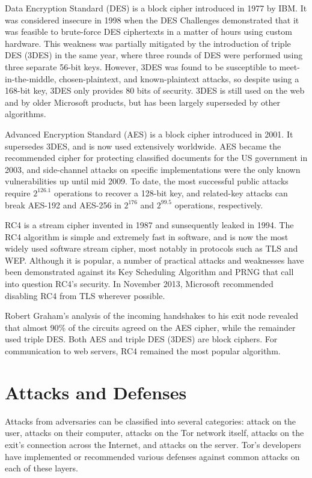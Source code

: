\documentclass[journal]{IEEEtran}
\begin{document}
Data Encryption Standard (DES) is a block cipher introduced in 1977 by IBM. It was considered insecure in 1998 when the DES Challenges demonstrated that it was feasible to brute-force DES ciphertexts in a matter of hours using custom hardware. This weakness was partially mitigated by the introduction of triple DES (3DES) in the same year, where three rounds of DES were performed using three separate 56-bit keys. However, 3DES was found to be susceptible to meet-in-the-middle, chosen-plaintext, and known-plaintext attacks, so despite using a 168-bit key, 3DES only provides 80 bits of security.\cite{NIST2007} 3DES is still used on the web and by older Microsoft products, but has been largely superseded by other algorithms.

Advanced Encryption Standard (AES) is a block cipher introduced in 2001. It supersedes 3DES, and is now used extensively worldwide. AES became the recommended cipher for protecting classified documents for the US government in 2003, and side-channel attacks on specific implementations were the only known vulnerabilities up until mid 2009. To date, the most successful public attacks require $ 2^126.1 $ operations to recover a 128-bit key,\cite{Nikolic2009} and related-key attacks can break AES-192 and AES-256 in $ 2^176 $ and $ 2^99.5 $ operations,\cite{Bogdanov2011} respectively.

RC4 is a stream cipher invented in 1987 and sunsequently leaked in 1994. The RC4 algorithm is simple and extremely fast in software, and is now the most widely used software stream cipher, most notably in protocols such as TLS and WEP. Although it is popular, a number of practical attacks and weaknesses have been demonstrated against its Key Scheduling Algorithm and PRNG that call into question RC4's security. In November 2013, Microsoft recommended disabling RC4 from TLS wherever possible.

Robert Graham's analysis of the incoming handshakes to his exit node revealed that almost 90\% of the circuits agreed on the AES cipher, while the remainder used triple DES. Both AES and triple DES (3DES) are block ciphers. For communication to web servers, RC4 remained the most popular algorithm.

\section{Attacks and Defenses}

Attacks from adversaries can be classified into several categories: attack on the user, attacks on their computer, attacks on the Tor network itself, attacks on the exit's connection across the Internet, and attacks on the server. Tor's developers have implemented or recommended various defenses against common attacks on each of these layers.
\end{document}
